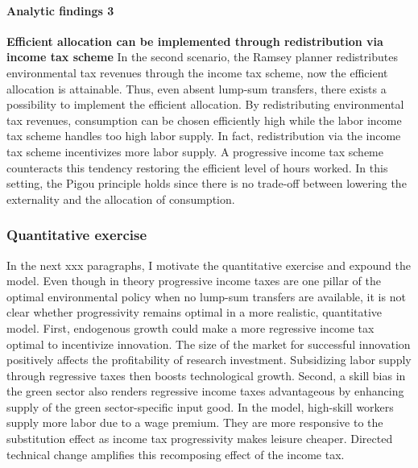 \paragraph{Analytic findings 3}
\textbf{Efficient allocation can be implemented through redistribution via income tax scheme}
In the second scenario, the Ramsey planner redistributes environmental tax revenues through the income tax scheme, now the efficient allocation is attainable. Thus, even absent lump-sum transfers, there exists a possibility to implement the efficient allocation. By redistributing environmental tax revenues, consumption can be chosen efficiently high while the labor income tax scheme handles too high labor supply. In fact, redistribution via the income tax scheme incentivizes more labor supply. A progressive income tax scheme counteracts this tendency restoring the efficient level of hours worked. 
In this setting, the Pigou principle holds since there is no trade-off between lowering the externality and the allocation of consumption.
% 
% 
% 


\subsubsection*{Quantitative exercise}
In the next xxx paragraphs, I motivate the quantitative exercise and expound the model.
Even though in theory progressive income taxes are one pillar of the optimal environmental policy when no lump-sum transfers are available, it is not clear whether progressivity remains optimal in a more realistic, quantitative model. 
First, endogenous growth could make a more regressive income tax optimal to incentivize innovation. The size of the market for successful innovation positively affects the profitability of research investment. Subsidizing labor supply through regressive taxes then boosts technological growth. Second, a skill bias in the green sector also renders regressive income taxes advantageous by enhancing supply of the green sector-specific input good. In the model, high-skill workers supply more labor due to a wage premium. They are more responsive to the substitution effect as income tax progressivity makes leisure cheaper. Directed technical change amplifies this recomposing effect of the income tax. 


